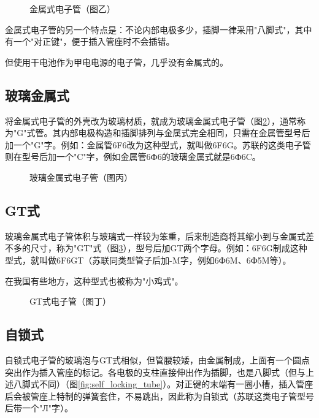 \documentclass[12pt,UTF8]{ctexbook}
\begin{document}
\begin{figure}[htbp]
    \centering
    \caption{金属式电子管（图乙）}
    \label{fig:metal_tube}
\end{figure}

金属式电子管的另一个特点是：不论内部电极多少，插脚一律采用"八脚式"，其中有一个"对正键"，便于插入管座时不会插错。

但使用干电池作为甲电电源的电子管，几乎没有金属式的。

\subsection{玻璃金属式}

将金属式电子管的外壳改为玻璃材质，就成为玻璃金属式电子管（图\ref{fig:glass_metal_tube}），通常称为"G"式管。其内部电极构造和插脚排列与金属式完全相同，只需在金属管型号后加一个"G"字。例如：金属管6F6改为这种型式，就叫做6F6G。苏联的这类电子管则在型号后加一个"C"字，例如金属管6Ф6的玻璃金属式就是6Ф6C。

\begin{figure}[htbp]
    \centering
    \caption{玻璃金属式电子管（图丙）}
    \label{fig:glass_metal_tube}
\end{figure}

\subsection{GT式}

玻璃金属式电子管体积与玻璃式一样较为笨重，后来制造商将其缩小到与金属式差不多的尺寸，称为"GT"式（图\ref{fig:gt_tube}），型号后加GT两个字母。例如：6F6G制成这种型式，就叫做6F6GT（苏联同类型管子后加-M字，例如6Ф6M、6Ф5M等）。

在我国有些地方，这种型式也被称为"小鸡式"。

\begin{figure}[htbp]
    \centering
    \caption{GT式电子管（图丁）}
    \label{fig:gt_tube}
\end{figure}

\subsection{自锁式}

自锁式电子管的玻璃泡与GT式相似，但管腰较矮，由金属制成，上面有一个圆点突出作为插入管座的标记。各电极的支柱直接伸出作为插脚，也是八脚式（但与上述八脚式不同）（图\ref{fig:self_locking_tube}）。对正键的末端有一圈小槽，插入管座后会被管座上特制的弹簧套住，不易跳出，因此称为自锁式（苏联这类电子管型号后带一个"Л"字）。
\end{document}
